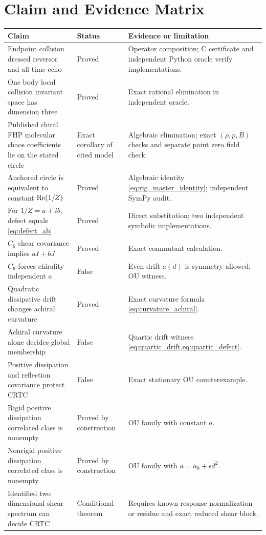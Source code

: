 \chapter{Claim and Evidence Matrix}\label{app:claims}

\begin{longtable}{p{}p{}p{}}
\toprule
Claim & Status & Evidence or limitation \\
\midrule
\endhead
Endpoint collision dressed reversor and all time echo & Proved & Operator composition; C certificate and independent Python oracle verify implementations.\\
One body local collision invariant space has dimension three & Proved & Exact rational elimination in independent oracle.\\
Published chiral FHP molecular chaos coefficients lie on the stated circle & Exact corollary of cited model & Algebraic elimination; \HXTransportGridPoints{} exact $(\rho,p,B)$ checks and separate \CRTCBoltzmannGridPoints{} point zero field check.\\
Anchored circle is equivalent to constant $\operatorname{Re}(1/Z)$ & Proved & Algebraic identity \cref{eq:rig_master_identity}; independent SymPy audit.\\
For $1/Z=a+ib$, defect equals \cref{eq:defect_ab} & Proved & Direct substitution; two independent symbolic implementations.\\
$C_6$ shear covariance implies $aI+bJ$ & Proved & Exact commutant calculation.\\
$C_6$ forces chirality independent $a$ & False & Even drift $a(d)$ is symmetry allowed; OU witness.\\
Quadratic dissipative drift changes achiral curvature & Proved & Exact curvature formula \cref{eq:curvature_achiral}.\\
Achiral curvature alone decides global membership & False & Quartic drift witness \cref{eq:quartic_drift,eq:quartic_defect}.\\
Positive dissipation and reflection covariance protect CRTC & False & Exact stationary OU counterexample.\\
Rigid positive dissipation correlated class is nonempty & Proved by construction & OU family with constant $a$.\\
Nonrigid positive dissipation correlated class is nonempty & Proved by construction & OU family with $a=a_0+\epsilon d^2$.\\
Identified two dimensional shear spectrum can decide CRTC & Conditional theorem & Requires known response normalization or residue and exact reduced shear block.\\

\end{longtable}
